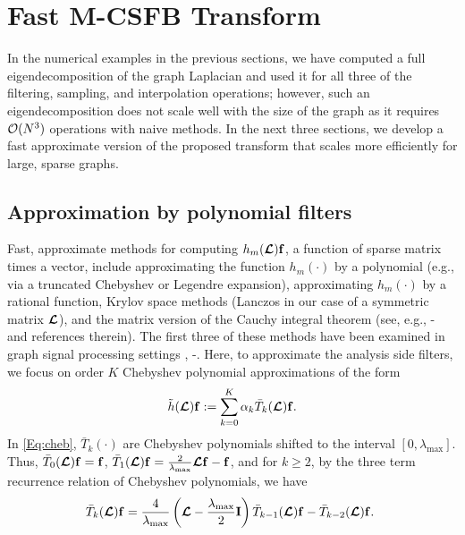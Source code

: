 \documentclass[journal, 10pt]{IEEEtran}
\begin{document}
\section{Fast M-CSFB Transform} \label{Se:fast_mcsfb}
In the numerical examples in the previous sections, we have computed a full eigendecomposition of the graph Laplacian and %
used it for all three of the filtering, sampling, and interpolation operations; however, such an eigendecomposition does not scale well with the size of the graph as it requires ${\cal O}(N^3)$ operations with naive methods. 
In %
the next three sections, we develop a fast approximate version of the proposed transform that scales more efficiently for large, sparse graphs. 

\subsection{Approximation by polynomial filters} \label{Se:poly_approx}

Fast, approximate methods for computing $h_m(\boldsymbol{\mathcal{L}}){\bf f}$, a function of sparse matrix times a vector, include approximating the function $h_m(\cdot)$ by a polynomial (e.g., via a truncated Chebyshev or Legendre expansion), approximating $h_m(\cdot)$ by a rational function, Krylov space methods (Lanczos in our case of a symmetric matrix $\boldsymbol{\mathcal{L}}$), and the matrix version of the Cauchy integral theorem (see, e.g., \cite{higham}\nocite{davies2005computing, frommer}-\cite{dubious} and references therein). The first three of these methods have been examined in graph signal processing settings \cite{hammond2011wavelets,PuyTGV15},  \cite{shuman_distributed_sipn}\nocite{susnjara, shi2015infinite}-\cite{loukas2015distributed}. %
Here, to approximate the analysis side filters, %
we focus on order $K$ Chebyshev polynomial approximations of the form
\begin{align}\label{Eq:cheb}
\tilde{h}(\L){\bf f} := \sum_{k=0}^K \alpha_k \bar{T}_k(\L){\bf f}.
\end{align}
In \eqref{Eq:cheb}, $\bar{T}_k(\cdot)$ are Chebyshev polynomials shifted to the interval $[0,\lambda_{\max}]$. Thus,  $\bar{T}_0(\boldsymbol{\mathcal{L}}){\bf f} = {\bf f}$, $\bar{T}_1(\boldsymbol{\mathcal{L}}){\bf f} = \frac{2}{\lambda_{\max}}\boldsymbol{\mathcal{L}}{\bf f}-{\bf f}$, and for $k\geq 2$, by the three term recurrence relation of Chebyshev polynomials, we have
\begin{align}\label{Eq:Tkbar_rec}
\hspace{-.05in}\bar{T}_k(\L){\bf f} = \frac{4}{\lambda_{\max}}\left(\L-\frac{\lambda_{\max}}{2}{\bf I}\right)\bar{T}_{k-1}(\L){\bf f}-\bar{T}_{k-2}(\L){\bf f}.
\end{align}
\end{document}
